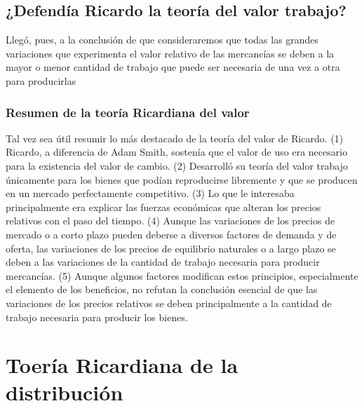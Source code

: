 \documentclass[10pt]{book}
\begin{document}
\subsection*{¿Defendía Ricardo la teoría del valor trabajo?}
Llegó, pues, a la conclusión de que consideraremos que todas las grandes variaciones que experimenta el valor relativo de las mercancías se deben a la mayor o menor cantidad de trabajo que puede ser necesaria de una vez a otra para producirlas

\subsubsection*{Resumen de la teoría Ricardiana del valor}
Tal vez sea útil resumir lo más destacado de la teoría del valor de Ricardo. (1) Ricardo, a diferencia de Adam Smith, sostenía que el valor de uso era necesario para la existencia del valor de cambio. (2) Desarrolló su teoría del valor trabajo únicamente para los bienes que podían reproducirse libremente y que se producen en un mercado perfectamente competitivo. (3) Lo que le interesaba principalmente era explicar las fuerzas económicas que alteran los precios relativos con el paso del tiempo. (4) Aunque las variaciones de los precios de mercado o a corto plazo pueden deberse a diversos factores de demanda y de oferta, las variaciones de los precios de equilibrio naturales o a largo plazo se deben a las variaciones de la cantidad de trabajo necesaria para producir mercancías. (5) Aunque algunos factores modifican estos principios, especialmente el elemento de los beneficios, no refutan la conclusión esencial de que las variaciones de los precios relativos se deben principalmente a la cantidad de trabajo necesaria para producir los bienes.

\section{Toería Ricardiana de la distribución}
\end{document}
